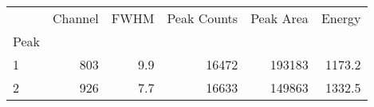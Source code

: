 \begin{tabular}{lrrrrr}
\toprule
{} &  Channel &  FWHM &  Peak Counts &  Peak Area &  Energy \\
Peak &          &       &              &            &         \\
\midrule
1    &      803 &   9.9 &        16472 &     193183 &  1173.2 \\
2    &      926 &   7.7 &        16633 &     149863 &  1332.5 \\
\bottomrule
\end{tabular}
